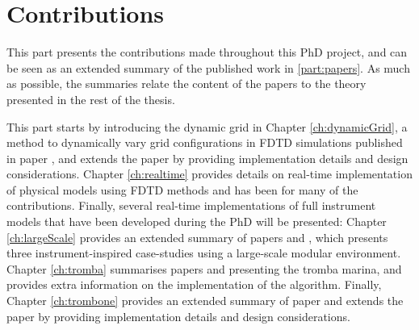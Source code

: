\chapter*{Contributions}
This part presents the contributions made throughout this PhD project, and can be seen as an extended summary of the published work in \ref{part:papers}. As much as possible, the summaries relate the content of the papers to the theory presented in the rest of the thesis. 

This part starts by introducing the dynamic grid in Chapter \ref{ch:dynamicGrid}, a method to dynamically vary grid configurations in FDTD simulations published in paper \citeP[G], and extends the paper by providing implementation details and design considerations. Chapter \ref{ch:realtime} provides details on real-time implementation of physical models using FDTD methods and has been for many of the contributions. 
Finally, several real-time implementations of full instrument models that have been developed during the PhD will be presented: Chapter \ref{ch:largeScale} provides an extended summary of papers \citeP[A] and \citeP[B], which presents three instrument-inspired case-studies using a large-scale modular environment. Chapter \ref{ch:tromba} summarises papers \citeP[D] and \citeP[E] presenting the tromba marina, and provides extra information on the implementation of the algorithm. Finally, Chapter \ref{ch:trombone} provides an extended summary of paper \citeP[H] and extends the paper by providing implementation details and design considerations.